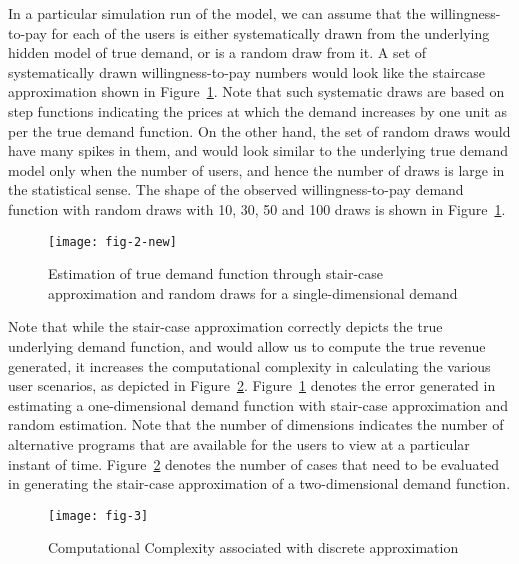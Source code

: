 \documentclass[conference,a4paper]{IEEEtran}
\begin{document}
In a particular simulation run of the model, we can assume that the willingness-to-pay for each of the users is either systematically drawn from the underlying hidden model of true demand, or is a random draw from it. A set of systematically drawn willingness-to-pay numbers would look like the staircase approximation shown in Figure~\ref{fig:single-dim-demand-estimation}. Note that such systematic draws are based on step functions indicating the prices at which the demand increases by one unit as per the true demand function. On the other hand, the set of random draws would have many spikes in them, and would look similar to the underlying true demand model only when the number of users, and hence the number of draws is large in the statistical sense. The shape of the observed willingness-to-pay demand function with random draws with 10, 30, 50 and 100 draws is shown in Figure~\ref{fig:single-dim-demand-estimation}.  

\begin{figure}
  \texttt{[image: fig-2-new]}
  \caption{Estimation of true demand function through stair-case approximation and random draws for a single-dimensional demand}
  \label{fig:single-dim-demand-estimation}
\end{figure}
Note that while the stair-case approximation correctly depicts the true underlying demand function, and would allow us to compute the true revenue generated, it increases the computational complexity in calculating the various user scenarios, as depicted in Figure~\ref{fig:comp-complexity}. Figure~\ref{fig:single-dim-demand-estimation} denotes the error generated in estimating a one-dimensional demand function with stair-case approximation and random estimation. Note that the number of dimensions indicates the number of alternative programs that are available for the users to view at a particular instant of time. Figure~\ref{fig:comp-complexity} denotes the number of cases that need to be evaluated in generating the stair-case approximation of a two-dimensional demand function.  

\begin{figure}
  \texttt{[image: fig-3]}
  \caption{Computational Complexity associated with discrete approximation}
  \label{fig:comp-complexity}
\end{figure}
\end{document}
